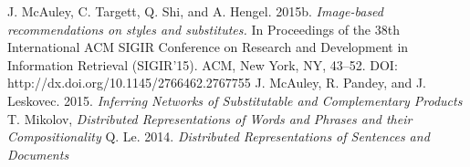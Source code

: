 \documentclass[a4paper, 11pt]{article}
\begin{document}
\begin{thebibliography}{9}
 J. McAuley, C. Targett, Q. Shi, and A. Hengel. 2015b. \emph{Image-based recommendations on styles and substitutes.} In Proceedings of the 38th International ACM SIGIR Conference on Research and Development in Information Retrieval (SIGIR’15). ACM, New York, NY, 43–52. DOI: http://dx.doi.org/10.1145/2766462.2767755
 J. McAuley, R. Pandey, and J. Leskovec. 2015. \emph{Inferring Networks of Substitutable and Complementary Products}
 T. Mikolov, \emph{Distributed Representations of Words and Phrases and their Compositionality}
 Q. Le. 2014. \emph{Distributed Representations of Sentences and Documents}

\end{thebibliography}
\end{document}
